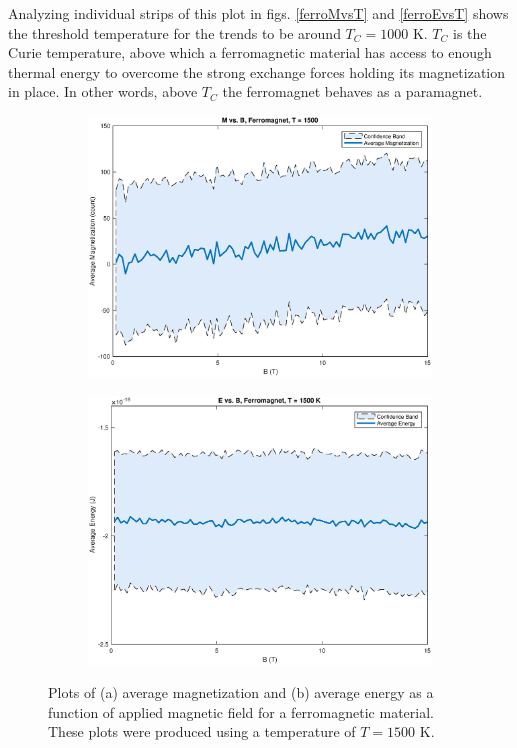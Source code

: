 \documentclass[12pt]{article}
\begin{document}
Analyzing individual strips of this plot in figs. \ref{ferroMvsT} and \ref{ferroEvsT} shows the threshold temperature for the trends to be around $T_C = 1000$ K.  $T_C$ is the Curie temperature, above which a ferromagnetic material has access to enough thermal energy to overcome the strong exchange forces holding its magnetization in place.  In other words, above $T_C$ the ferromagnet behaves as a paramagnet. \cite{magnettypes, fromjesse}
\begin{figure}[!h]
\begin{subfigure}{0.5\textwidth}
\includegraphics[width=\linewidth]{./Ferrographs/ferroMvsB.eps}
\caption{\label{ferroMvsB}}
\end{subfigure}
\begin{subfigure}{0.5\textwidth}
\includegraphics[width=\linewidth]{./Ferrographs/ferroEvsB.eps}
\caption{\label{ferroEvsB}}
\end{subfigure}
\caption{Plots of (a) average magnetization and (b) average energy as a function of applied magnetic field for a ferromagnetic material.  These plots were produced using a temperature of $T = 1500$ K.} 
\end{figure}
\end{document}
